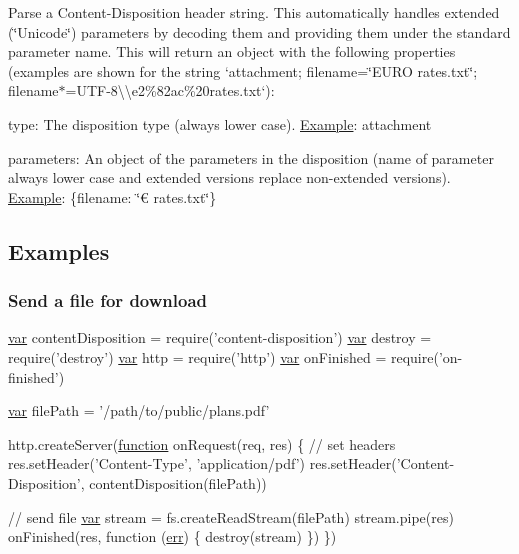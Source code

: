 Parse a {\ttfamily Content-\/\+Disposition} header string. This automatically handles extended (\char`\"{}\+Unicode\char`\"{}) parameters by decoding them and providing them under the standard parameter name. This will return an object with the following properties (examples are shown for the string `\textquotesingle{}attachment; filename=\char`\"{}\+E\+U\+R\+O rates.\+txt\char`\"{}; filename$\ast$=U\+T\+F-\/8\textbackslash{}\textquotesingle{}\textbackslash{}\textquotesingle{}e2\%82ac\%20rates.\+txt\textquotesingle{}`)\+:


\begin{DoxyItemize}
\item {\ttfamily type}\+: The disposition type (always lower case). \hyperlink{struct_example}{Example}\+: {\ttfamily \textquotesingle{}attachment\textquotesingle{}}
\item {\ttfamily parameters}\+: An object of the parameters in the disposition (name of parameter always lower case and extended versions replace non-\/extended versions). \hyperlink{struct_example}{Example}\+: {\ttfamily \{filename\+: \char`\"{}€ rates.\+txt\char`\"{}\}}
\end{DoxyItemize}

\subsection*{Examples}

\subsubsection*{Send a file for download}


\begin{DoxyCode}
\hyperlink{018__def_8c_a335628f2e9085305224b4f9cc6e95ed5}{var} contentDisposition = require(\textcolor{stringliteral}{'content-disposition'})
\hyperlink{018__def_8c_a335628f2e9085305224b4f9cc6e95ed5}{var} destroy = require('destroy')
\hyperlink{018__def_8c_a335628f2e9085305224b4f9cc6e95ed5}{var} http = require('http')
\hyperlink{018__def_8c_a335628f2e9085305224b4f9cc6e95ed5}{var} onFinished = require('on-finished')

\hyperlink{018__def_8c_a335628f2e9085305224b4f9cc6e95ed5}{var} filePath = '/path/to/public/plans.pdf'

http.createServer(\hyperlink{class_test_a51a683fa4fcec142ab1574e00a7b6860}{function} onRequest(req, res) \{
  \textcolor{comment}{// set headers}
  res.setHeader(\textcolor{stringliteral}{'Content-Type'}, \textcolor{stringliteral}{'application/pdf'})
  res.setHeader(\textcolor{stringliteral}{'Content-Disposition'}, contentDisposition(filePath))

  \textcolor{comment}{// send file}
  \hyperlink{018__def_8c_a335628f2e9085305224b4f9cc6e95ed5}{var} stream = fs.createReadStream(filePath)
  stream.pipe(res)
  onFinished(res, \textcolor{keyword}{function} (\hyperlink{message_8cpp_aede5746344fdce99647541101eaa7f06}{err}) \{
    destroy(stream)
  \})
\})
\end{DoxyCode}


